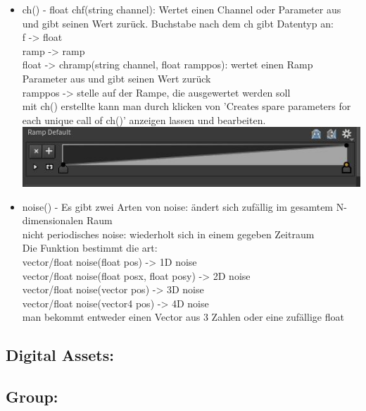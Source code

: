\documentclass[paper=a4,fontsize=12pt,ngerman]{scrartcl}
\begin{document}
\begin{itemize}
 		\item ch() - float chf(string channel): Wertet einen Channel oder Parameter aus und gibt seinen Wert zurück. Buchstabe nach dem ch gibt Datentyp an:\\ 
 		f -> float\\
 		ramp -> ramp\\
 		float -> chramp(string channel, float ramppos): 
 		wertet einen Ramp Parameter aus und gibt seinen Wert zurück	\\
 		ramppos -> stelle auf der Rampe, die ausgewertet werden soll\\
 		mit ch() erstellte kann man durch klicken von 'Creates spare parameters for each unique call of ch()' anzeigen lassen und bearbeiten. \\
 		\includegraphics*[width=\textwidth]{graphics/attribVOPramp.JPG}\\
 		\item noise() - Es gibt zwei Arten von noise: ändert sich zufällig im gesamtem N-dimensionalen Raum\\
 		nicht periodisches noise: wiederholt sich in einem gegeben Zeitraum\\
 		Die Funktion bestimmt die art:\\
 		vector/float noise(float pos) -> 1D noise\\	
 		vector/float noise(float posx, float posy) -> 2D noise\\
 		vector/float noise(vector pos) -> 3D noise\\
 		vector/float noise(vector4 pos) -> 4D noise\\
 		man bekommt entweder einen Vector aus 3 Zahlen oder eine zufällige float\\
 	\end{itemize}
	
	\subsection*{Digital Assets:}
	
	\subsection*{Group:}
\end{document}
